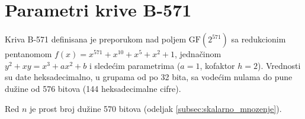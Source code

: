 \chapter{Parametri krive B-571}
\label{app:b571}

Kriva B-571 definisana je preporukom \cite{sp800186} nad poljem $\mathrm{GF}(2^{571})$ sa redukcionim pentanomom $f(x) = x^{571} + x^{10} + x^5 + x^2 + 1$, jednačinom $y^2 + xy = x^3 + ax^2 + b$ i sledećim parametrima ($a = 1$, kofaktor $h = 2$). Vrednosti su date heksadecimalno, u grupama od po 32 bita, sa vodećim nulama do pune dužine od 576 bitova (144 heksadecimalne cifre).

\medbreak

\medbreak

Red $n$ je prost broj dužine 570 bitova (odeljak \ref{subsec:skalarno_mnozenje}).
